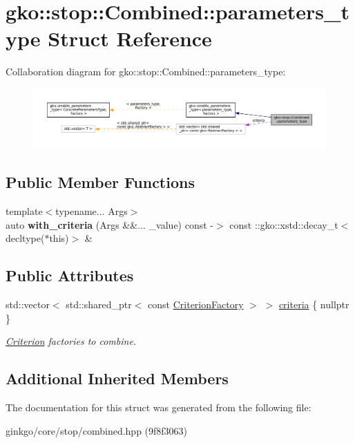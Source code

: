 \hypertarget{structgko_1_1stop_1_1Combined_1_1parameters__type}{}\section{gko\+:\+:stop\+:\+:Combined\+:\+:parameters\+\_\+type Struct Reference}
\label{structgko_1_1stop_1_1Combined_1_1parameters__type}


Collaboration diagram for gko\+:\+:stop\+:\+:Combined\+:\+:parameters\+\_\+type\+:
\nopagebreak
\begin{figure}[H]
\begin{center}
\leavevmode
\includegraphics[width=350pt]{structgko_1_1stop_1_1Combined_1_1parameters__type__coll__graph}
\end{center}
\end{figure}
\subsection*{Public Member Functions}
\begin{DoxyCompactItemize}
\item 
\mbox{\label{structgko_1_1stop_1_1Combined_1_1parameters__type_ae9e759fd53bb4bef3e8899a5bb462eec}} 
{\footnotesize template$<$typename... Args$>$ }\\auto {\bfseries with\+\_\+criteria} (Args \&\&... \+\_\+value) const -\/$>$ const \+::gko\+::xstd\+::decay\+\_\+t$<$ decltype($\ast$this)$>$ \&
\end{DoxyCompactItemize}
\subsection*{Public Attributes}
\begin{DoxyCompactItemize}
\item 
\mbox{\label{structgko_1_1stop_1_1Combined_1_1parameters__type_a2ab63880c1758c42b3a175cd6b004635}} 
std\+::vector$<$ std\+::shared\+\_\+ptr$<$ const \hyperlink{group__stop_gab12a51109c50b35ec36dc5a393d6a9a0}{Criterion\+Factory} $>$ $>$ \hyperlink{structgko_1_1stop_1_1Combined_1_1parameters__type_a2ab63880c1758c42b3a175cd6b004635}{criteria} \{ nullptr \}
\begin{DoxyCompactList}\small\item\em \hyperlink{classgko_1_1stop_1_1Criterion}{Criterion} factories to combine. \end{DoxyCompactList}\end{DoxyCompactItemize}
\subsection*{Additional Inherited Members}


The documentation for this struct was generated from the following file\+:\begin{DoxyCompactItemize}
\item 
ginkgo/core/stop/combined.\+hpp (9f8f3063)\end{DoxyCompactItemize}
